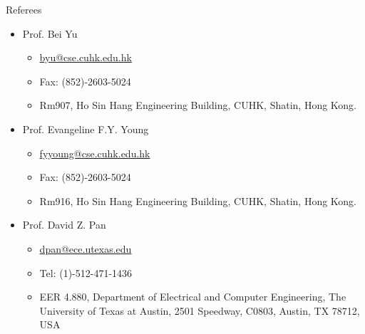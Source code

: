 
\begin{rSection}{Referees}
	
\begin{itemize}
	\item Prof. Bei Yu
	\begin{itemize}
		\item \url{byu@cse.cuhk.edu.hk}
		\item Fax: (852)-2603-5024
		\item Rm907, Ho Sin Hang Engineering Building, CUHK, Shatin, Hong Kong.
	\end{itemize}
	\item Prof. Evangeline F.Y. Young
	\begin{itemize}
		\item \url{fyyoung@cse.cuhk.edu.hk}
		\item Fax: (852)-2603-5024
		\item Rm916, Ho Sin Hang Engineering Building, CUHK, Shatin, Hong Kong.
	\end{itemize}
	\item Prof. David Z. Pan
	\begin{itemize}
		\item \url{dpan@ece.utexas.edu}
		\item Tel: (1)-512-471-1436
		\item EER 4.880, Department of Electrical and Computer Engineering, The University of Texas at Austin,	2501 Speedway, C0803, Austin, TX 78712, USA
	\end{itemize}
\end{itemize}
\end{rSection}